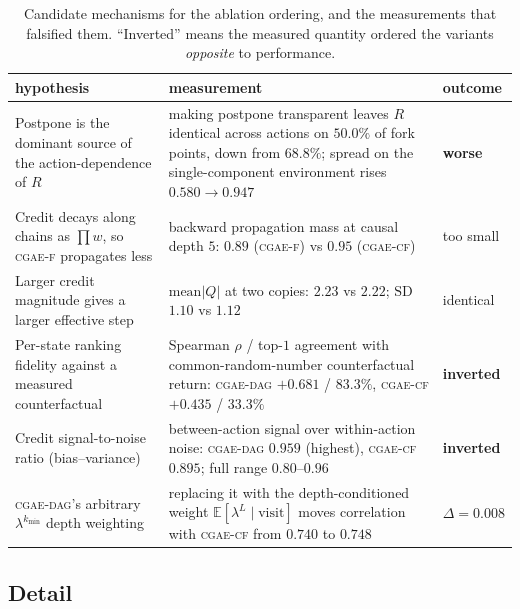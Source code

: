 \documentclass[review,authoryear,3p,times]{elsarticle}
\newcommand{\cflow}{\textsc{cgae-cf}}          %
\newcommand{\cflowraw}{\textsc{cgae-f}}        %
\newcommand{\cdag}{\textsc{cgae-dag}}          %
\newcommand{\Ex}{\mathbb{E}}
\begin{document}
\begin{table}[h]
\centering
\caption{Candidate mechanisms for the ablation ordering, and the measurements
that falsified them. ``Inverted'' means the measured quantity ordered the
variants \emph{opposite} to performance.}
\label{tab:falsified}
\small
\begin{tabular}{p{4.1cm}p{5.4cm}l}
\toprule
hypothesis & measurement & outcome \\
\midrule
Postpone is the dominant source of the action-dependence of $R$ &
making postpone transparent leaves $R$ identical across actions on $50.0\%$ of
fork points, down from $68.8\%$; spread on the single-component environment
rises $0.580\to0.947$ &
\textbf{worse} \\[2pt]
Credit decays along chains as $\prod w$, so \cflowraw{} propagates less &
backward propagation mass at causal depth $5$: $0.89$ (\cflowraw) vs $0.95$
(\cflow) &
too small \\[2pt]
Larger credit magnitude gives a larger effective step &
$\mathrm{mean}|Q|$ at two copies: $2.23$ vs $2.22$; $\mathrm{SD}$ $1.10$ vs
$1.12$ &
identical \\[2pt]
Per-state ranking fidelity against a measured counterfactual &
Spearman $\rho$ / top-$1$ agreement with common-random-number counterfactual
return: \cdag{} $+0.681$ / $83.3\%$, \cflow{} $+0.435$ / $33.3\%$ &
\textbf{inverted} \\[2pt]
Credit signal-to-noise ratio (bias--variance) &
between-action signal over within-action noise: \cdag{} $0.959$ (highest),
\cflow{} $0.895$; full range $0.80$--$0.96$ &
\textbf{inverted} \\[2pt]
\cdag's arbitrary $\lambda^{k_{\min}}$ depth weighting &
replacing it with the depth-conditioned weight $\Ex[\lambda^{L}\mid\text{visit}]$
moves correlation with \cflow{} from $0.740$ to $0.748$ &
$\Delta=0.008$ \\
\bottomrule
\end{tabular}
\end{table}

\subsection{Detail}
\end{document}
